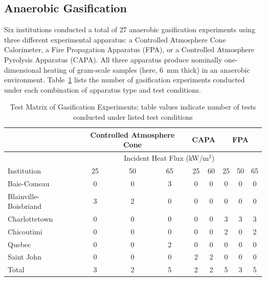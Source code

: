 \documentclass{book}
\begin{document}
\subsection{Anaerobic Gasification}

Six institutions conducted a total of 27 anaerobic gasification experiments using three different experimental apparatus: a Controlled Atmosphere Cone Calorimeter, a Fire Propagation Apparatus (FPA), or a Controlled Atmosphere Pyrolysis Apparatus (CAPA). All three apparatus produce nominally one-dimensional heating of gram-scale samples (here, 6~mm thick) in an anaerobic environment. Table~\ref{Table:Gasification_Matrix} lists the number of gasification experiments conducted under each combination of apparatus type and test conditions.

\begin{table}[ht]
\caption{Test Matrix of Gasification Experiments; table values indicate number of tests conducted under listed test conditions}
\label{Table:Gasification_Matrix}
\begin{center}
\begin{tabular}{l|ccc|cc|ccc}
\hline
                         & \multicolumn{3}{|c|}{Controlled Atmosphere Cone} & \multicolumn{2}{|c|}{CAPA} & \multicolumn{3}{|c|}{FPA}     \\ \hline
                         & \multicolumn{8}{c}{Incident Heat Flux (kW/m$^2$)}                                                       \\ %
Institution              & 25 & 50 & 65 & 25 & 60 & 25 & 50 & 65                                                                   \\ \hline
Baie-Comeau              & 0  & 0  & 3  & 0  & 0  & 0  & 0  & 0                                                                    \\
Blainville-Boisbriand    & 3  & 2  & 0  & 0  & 0  & 0  & 0  & 0                                                                    \\
Charlottetown            & 0  & 0  & 0  & 0  & 0  & 3  & 3  & 3                                                                    \\
Chicoutimi               & 0  & 0  & 0  & 0  & 0  & 2  & 0  & 2                                                                    \\
Quebec                   & 0  & 0  & 2  & 0  & 0  & 0  & 0  & 0                                                                    \\
Saint John               & 0  & 0  & 0  & 2  & 2  & 0  & 0  & 0                                                                    \\ \hline
Total                    & 3  & 2  & 5  & 2  & 2  & 5  & 3  & 5                                                                    \\ \hline
\end{tabular}
\end{center}
\end{table}
\end{document}
